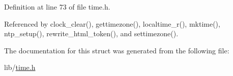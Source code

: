 Definition at line 73 of file time.\-h.



Referenced by clock\-\_\-clear(), gettimezone(), localtime\-\_\-r(), mktime(), ntp\-\_\-setup(), rewrite\-\_\-html\-\_\-token(), and settimezone().



The documentation for this struct was generated from the following file\-:\begin{DoxyCompactItemize}
\item 
lib/\hyperlink{time_8h}{time.\-h}\end{DoxyCompactItemize}
